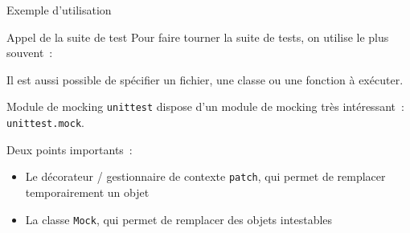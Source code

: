\begin{frame}{Exemple d'utilisation}
\end{frame}

\begin{frame}{Appel de la suite de test}
  Pour faire tourner la suite de tests, on utilise le plus souvent~:


  Il est aussi possible de spécifier un fichier, une classe ou une fonction à exécuter.
\end{frame}

\begin{frame}{Module de mocking}
  \texttt{unittest} dispose d'un module de mocking très intéressant~: \texttt{unittest.mock}.

  Deux points importants~:
  \begin{itemize}[<+->]
    \item Le décorateur / gestionnaire de contexte \texttt{patch}, qui permet de remplacer temporairement un objet
    \item La classe \texttt{Mock}, qui permet de remplacer des objets intestables
  \end{itemize}
\end{frame}
